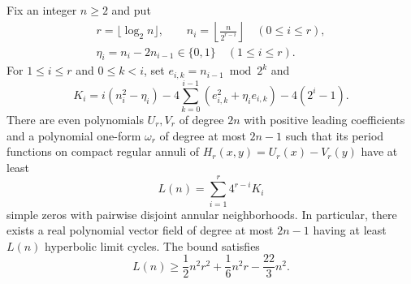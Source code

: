 \begin{proposition}\label{prop:mechanical-certificate}
Fix an integer $n\geq2$ and put
\[
 \begin{gathered}
 r=\lfloor\log_2 n\rfloor,\qquad
 n_i=\left\lfloor\frac{n}{2^{r-i}}\right\rfloor
 \quad(0\leq i\leq r),\\
 \eta_i=n_i-2n_{i-1}\in\{0,1\}\quad(1\le i\le r).
 \end{gathered}
\]
For $1\leq i\leq r$ and $0\leq k<i$, set
$e_{i,k}=n_{i-1}\bmod 2^k$ and
\begin{equation}\label{eq:mechanical-birth}
 K_i=i(n_i^2-\eta_i)
       -4\sum_{k=0}^{i-1}(e_{i,k}^2+\eta_i e_{i,k})
       -4(2^i-1).
\end{equation}
There are even polynomials $U_r,V_r$ of degree $2n$ with positive
leading coefficients and a polynomial one-form $\omega_r$ of degree
at most $2n-1$ such that its period functions on compact regular annuli
of $H_r(x,y)=U_r(x)-V_r(y)$ have at least
\begin{equation}\label{eq:mechanical-total}
 L(n)=\sum_{i=1}^{r}4^{r-i}K_i
\end{equation}
simple zeros with pairwise disjoint annular neighborhoods.
In particular, there exists a real polynomial vector field of degree at
most $2n-1$ having at least $L(n)$ hyperbolic limit cycles. The bound satisfies
\begin{equation}\label{eq:finitebound}
 L(n)\ge\frac12n^2r^2+\frac16n^2r-\frac{22}{3}n^2.
\end{equation}
\end{proposition}

